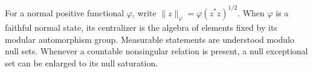 For a normal positive functional $\varphi$, write $\|z\|_\varphi=\varphi(z^*z)^{1/2}$. When $\varphi$ is a faithful normal state, its centralizer is the algebra of elements fixed by its modular automorphism group. Measurable statements are understood modulo null sets. Whenever a countable nonsingular relation is present, a null exceptional set can be enlarged to its null saturation.
